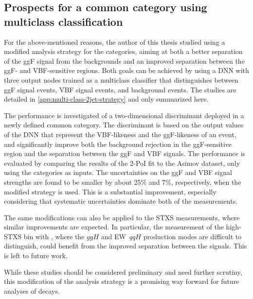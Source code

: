 \subsection{Prospects for a common \TwoJet category using multiclass classification}
For the above-mentioned reasons, the author of this thesis studied using a modified analysis strategy for the \TwoJet categories, aiming at both a better separation of the ggF signal from the backgrounds and an improved separation between the ggF- and VBF-sensitive \TwoJet regions. 
Both goals can be achieved by using a DNN with three output nodes trained as a multiclass classifier that distinguishes between ggF signal events, VBF signal events, and background events. The studies are detailed in \cref{app:multi-class-2jet-strategy} and only summarized here. 

The performance is investigated of a two-dimensional discriminant deployed in a newly defined common \TwoJet category.
The discriminant is based on the output values of the DNN that represent the VBF-likeness and the ggF-likeness of an event, and significantly improve both the background rejection in the ggF-sensitive region and the separation between the ggF and VBF signals.
The performance is evaluated by comparing the results of the 2-PoI fit to the Asimov dataset, only using the \TwoJet categories as inputs. 
The uncertainties on the ggF and VBF signal strengths are found to be smaller by about 25\% and 7\%, respectively, when the modified \TwoJet strategy is used. 
This is a substantial improvement, especially considering that systematic uncertainties dominate both of the measurements. 

The same modifications can also be applied to the STXS measurements, where similar improvements are expected. In particular, the measurement of the high-\pT STXS bin with \TwoJet, where the $ggH$ and EW~$qqH$ production modes are difficult to distinguish, could benefit from the improved separation between the signals. This is left to future work. 

While these studies should be considered preliminary and need further scrutiny, this modification of the \TwoJet analysis strategy is a promising way forward for future analyses of \HWW decays.





